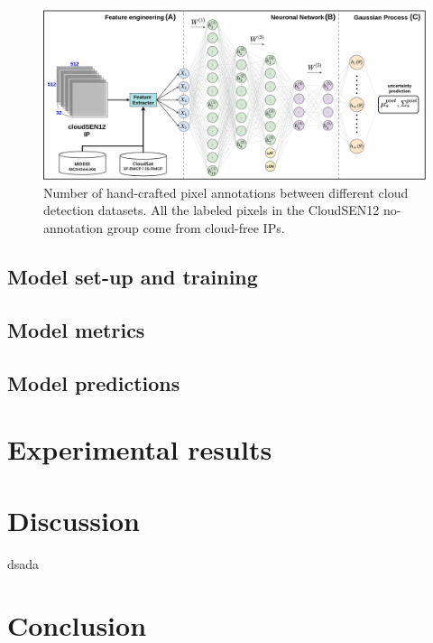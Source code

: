 \documentclass[a4paper, nobind]{templates/cdethesis}
\begin{document}
\begin{figure}[!h]
    \centering
    \includegraphics[width=1\linewidth]{figures/chapter02/figure02.png}
    \caption{Number of hand-crafted pixel annotations between different cloud detection datasets. All the labeled pixels in the CloudSEN12 no-annotation group come from cloud-free IPs.}
    \label{fig:figure02}
\end{figure}

\hypertarget{model-set-up-and-training}{%
\subsection{Model set-up and training}\label{model-set-up-and-training}}

\hypertarget{model-metrics}{%
\subsection{Model metrics}\label{model-metrics}}

\hypertarget{model-predictions}{%
\subsection{Model predictions}\label{model-predictions}}

\hypertarget{experimental-results}{%
\section{Experimental results}\label{experimental-results}}

\hypertarget{discussion}{%
\section{Discussion}\label{discussion}}

dsada

\hypertarget{conclusion}{%
\section{Conclusion}\label{conclusion}}
\end{document}
